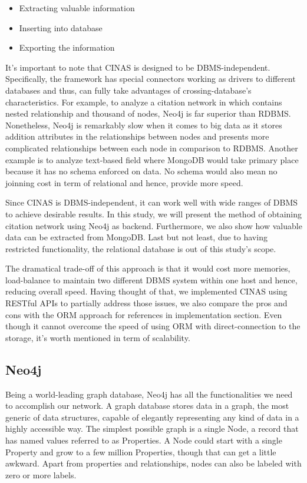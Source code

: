 \documentclass{sig-alternate}
\begin{document}
{\begin{itemize}
\item Extracting valuable information
\item Inserting into database
\item Exporting the information
\end{itemize}

It's important to note that CINAS is designed to be DBMS-independent. Specifically, the framework has special connectors working as drivers to different databases and thus, can fully take advantages of crossing-database's characteristics. For example, to analyze a citation network in which contains nested relationship and thousand of nodes,  Neo4j is far superior than RDBMS. Nonetheless, Neo4j is remarkably slow when it comes to big data as it stores addition attributes in the relationships between nodes and presents more complicated relationships between each node in comparison to RDBMS. Another example is to analyze text-based field where MongoDB would take primary place because it has no schema enforced on data. No schema would also mean no joinning cost in term of relational and hence, provide more speed. 

Since CINAS is DBMS-independent, it can work well with wide ranges of DBMS to achieve desirable results. In this study, we will present the method of obtaining citation network using Neo4j as backend. Furthermore, we also show how valuable data can be extracted from MongoDB. Last but not least, due to having restricted functionality, the relational database is out of this study's scope.

The dramatical trade-off of this approach is that it would cost more memories, load-balance to maintain two different DBMS system within one host and hence, reducing overall speed. Having thought of that, we implemented CINAS using RESTful APIs to partially address those issues, we also compare the pros and cons with the ORM approach for references in implementation section. Even though it cannot overcome the speed of using ORM with direct-connection to the storage, it's worth mentioned in term of scalability.
\subsection{Neo4j }
Being a world-leading graph database, Neo4j has all the functionalities we need to accomplish our network. A graph database stores data in a graph, the most generic of data structures, capable of elegantly representing any kind of data in a highly accessible way. The simplest possible graph is a single Node, a record that has named values referred to as Properties. A Node could start with a single Property and grow to a few million Properties, though that can get a little awkward. Apart from properties and relationships, nodes can also be labeled with zero or more labels.

}
\end{document}
